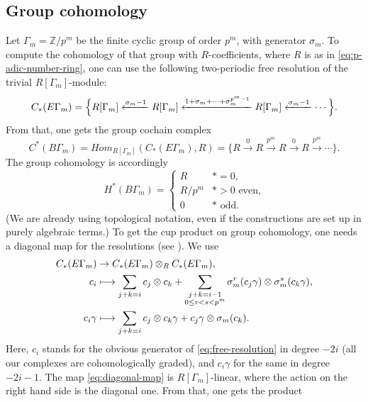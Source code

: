 \documentclass[JEP,XML,SOM,Unicode,NoFloatCountersInSection,published]{cedram}
\newcommand\mto{\mathchoice{\longmapsto}{\mapsto}{\mapsto}{\mapsto}}
\theoremstyle{plain}
\theoremstyle{definition}
\newcommand{\bZ}{{\mathbb Z}}
\begin{document}
\subsection{Group cohomology}
Let $\Gamma_m = \bZ/p^m$ be the finite cyclic group of order $p^m$, with generator $\sigma_m$. To compute the cohomology of that group with $R$-coefficients, where $R$ is as in \eqref{eq:p-adic-number-ring}, one can use the following two-periodic free resolution of the trivial $R[\Gamma_m]$-module:
\begin{equation} \label{eq:free-resolution}
C_*(E\Gamma_m) = \Bigl\{
R[\Gamma_m] \xleftarrow{\sigma_m-1} R[\Gamma_m] \xleftarrow{1+\sigma_m+\cdots+\sigma_m^{p^m-1}} R[\Gamma_m] \xleftarrow{\sigma_m-1} \cdots \Bigr\}.
\end{equation}
From that, one gets the group cochain complex
\begin{equation} \label{eq:standard-complex}
C^*(B\Gamma_m) =
\mathit{Hom}_{R[\Gamma_m]}(C_*(E\Gamma_m),R) =
\bigl\{ R \xrightarrow{0} R \xrightarrow{p^m} R \xrightarrow{0} R \xrightarrow{p^m} \cdots \bigr\}.
\end{equation}
The group cohomology is accordingly
\begin{equation*}
H^*(B\Gamma_m) = \begin{cases} R & \ast = 0, \\
R/p^m & \ast > 0 \text{ even,} \\
0 & \ast \text{ odd.}
\end{cases}
\end{equation*}
(We are already using topological notation, even if the constructions are set up in purely algebraic terms.) To get the cup product on group cohomology, one needs a diagonal map for the resolutions (see \eg \cite[Chap.\,5]{brown82}). We use
\begin{equation} \label{eq:diagonal-map}
\begin{aligned}
C_*(E\Gamma_m) &\to C_*(E\Gamma_m) \otimes_R C_*(E\Gamma_m), \\
c_i &\mto \sum_{j+k=i} c_j \otimes c_k + \sum_{\substack{j+k=i-1 \\ 0 \leq r<s < p^m}} \sigma_m^r( c_j\gamma) \otimes \sigma_m^s(c_k\gamma), \\
c_i \gamma &\mto \sum_{j+k=i} c_j \otimes c_k\gamma + c_j\gamma \otimes \sigma_m(c_k).
\end{aligned}
\end{equation}
Here, $c_i$ stands for the obvious generator of \eqref{eq:free-resolution} in degree $-2i$ (all our complexes are cohomologically graded), and $c_i\gamma$ for the same in degree $-2i-1$. The map \eqref{eq:diagonal-map} is $R[\Gamma_m]$-linear, where the action on the right hand side is the diagonal one. From that, one gets the product
\end{document}

